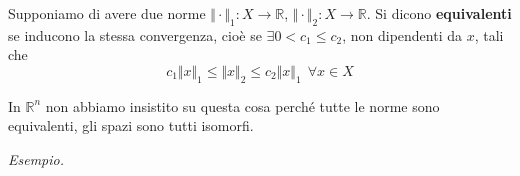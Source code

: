 \documentclass[10pt,a4paper,twoside,openright]{book}
\begin{document}
\begin{definition}
	Supponiamo di avere due norme $\Vert \cdotp \Vert _{1} :X\rightarrow \mathbb{R}$, $\Vert \cdotp \Vert _{2} :X\rightarrow \mathbb{R}$. Si dicono \textbf{equivalenti} se inducono la stessa convergenza, cioè se $\exists 0< c_{1} \leqslant c_{2}$, non dipendenti da $x$, tali che
	\begin{equation*}
		c_{1}\Vert x\Vert _{1} \leqslant \Vert x\Vert _{2} \leqslant c_{2}\Vert x\Vert _{1} \ \ \forall x\in X
	\end{equation*}
\end{definition}
\begin{nb}
	In $\mathbb{R}^{n}$ non abbiamo insistito su questa cosa perché tutte le norme sono equivalenti, gli spazi sono tutti isomorfi.
\end{nb}
\textit{Esempio.}
\end{document}
